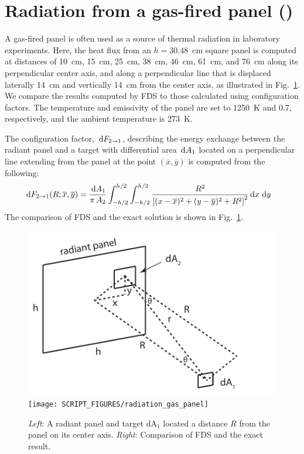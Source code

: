 \documentclass[11pt]{book}
\begin{document}
\section{Radiation from a gas-fired panel (\texorpdfstring{}{radiation\_gas\_panel}) }
\label{radiation_gas_panel}

A gas-fired panel is often used as a source of thermal radiation in laboratory experiments.  Here, the heat flux from an $h=30.48$~cm square panel is computed at distances of 10~cm, 15~cm, 25~cm, 38~cm, 46~cm, 61~cm, and 76~cm along its perpendicular center axis, and along a perpendicular line that is displaced laterally 14~cm and vertically 14~cm from the center axis, as illustrated in Fig.~\ref{radiation_gas_panel_plot}.  We compare the results computed by FDS to those calculated using configuration factors. The temperature and emissivity of the panel are set to 1250~K and 0.7, respectively, and the ambient temperature is 273~K.

The configuration factor, $\,\mathrm{d} F_{2 \rightarrow 1}$, describing the energy exchange between the radiant panel and a target with differential area $\,\mathrm{d} A_1$ located on a perpendicular line extending from the panel at the point  $(\overline{x}, \overline{y})$ is computed from the following:
\begin{align}
 \,\mathrm{d} F_{2 \rightarrow 1} (R; \overline{x}, \overline{y})
    &= \frac{\,\mathrm{d} A_1}{\pi \, A_2}
        \int_{-h/2}^{h/2} \int_{-h/2}^{h/2} \frac{R^2}{\left[ (x-\overline{x})^2 + (y-\overline{y})^2 + R^2 \right]^2} \,\mathrm{d} x \, \,\mathrm{d} y
 \label{eq:2->d1 configuration factor - general}
\end{align}
The comparison of FDS and the exact solution is shown in Fig.~\ref{radiation_gas_panel_plot}.

\begin{figure}[ht]
\centering
\includegraphics[height=2.in]{FIGURES/radiation_gas_panel_configuration}
\texttt{[image: SCRIPT\_FIGURES/radiation\_gas\_panel]}
\caption[The  case]{\emph{Left}: A radiant panel and target dA$_1$ located a distance $R$ from the panel on its center axis.  \emph{Right}: Comparison of FDS and the exact result.}
\label{radiation_gas_panel_plot}
\end{figure}
\end{document}
